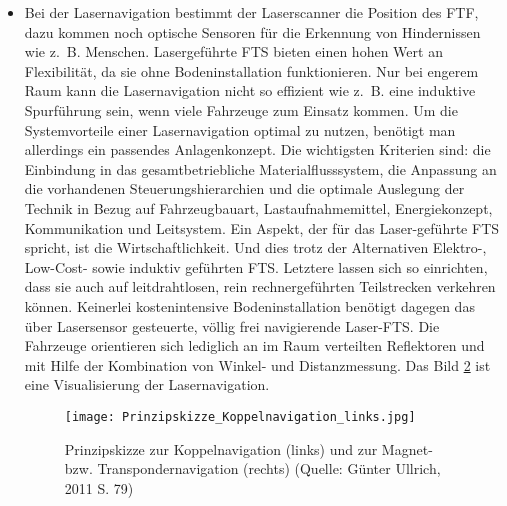 \begin{itemize}
\begin{figure}[h!]
			\label{Prinzipskizze_Koppelnavigation_rechts}
	\end{figure}	
	\item Bei der Lasernavigation bestimmt der Laserscanner die Position des FTF, dazu kommen noch optische Sensoren f\"ur die Erkennung von Hindernissen wie z.~B. Menschen.
Lasergef\"uhrte FTS bieten einen hohen Wert an Flexibilit\"at, da sie ohne Bodeninstallation funktionieren.
Nur bei engerem Raum kann die Lasernavigation nicht so effizient wie z.~B. eine induktive Spurf\"uhrung sein, wenn viele Fahrzeuge zum Einsatz kommen.
Um die Systemvorteile einer Lasernavigation optimal zu nutzen, ben\"otigt man allerdings ein passendes Anlagenkonzept.
Die wichtigsten Kriterien sind: die Einbindung in das gesamtbetriebliche Materialflusssystem, die Anpassung an die vorhandenen Steuerungshierarchien 
und die optimale Auslegung der Technik in Bezug auf Fahrzeugbauart, Lastaufnahmemittel, Energiekonzept, Kommunikation und Leitsystem.
Ein Aspekt, der f\"ur das Laser-gef\"uhrte FTS spricht, ist die Wirtschaftlichkeit.
Und dies trotz der Alternativen Elektro-, Low-Cost- sowie induktiv gef\"uhrten FTS.
Letztere lassen sich so einrichten, dass sie auch auf leitdrahtlosen, rein rechnergef\"uhrten Teilstrecken verkehren k\"onnen.
Keinerlei kostenintensive Bodeninstallation ben\"otigt dagegen das \"uber Lasersensor gesteuerte, v\"ollig frei navigierende Laser-FTS.
Die Fahrzeuge orientieren sich lediglich an im Raum verteilten Reflektoren und mit Hilfe der Kombination von Winkel- und Distanzmessung\cite[S. 2]{Werner:2014:Online}.
Das Bild \ref{Prinzipskizze_Koppelnavigation_links} ist eine Visualisierung der Lasernavigation.
	\begin{figure}[h!]
		\centering
		\texttt{[image: Prinzipskizze\_Koppelnavigation\_links.jpg]}
		\caption{Prinzipskizze zur Koppelnavigation (links) und zur Magnet- bzw. Transpondernavigation (rechts) (Quelle: G\"unter Ullrich, 2011 S. 79)}
		\label{Prinzipskizze_Koppelnavigation_links}
	\end{figure}


\end{itemize}
